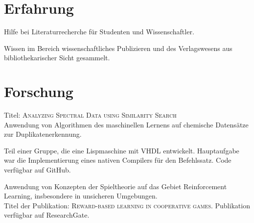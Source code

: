 \documentclass[]{deedy-resume-openfont}
\begin{document}
\begin{minipage}[t]{0.66\textwidth} 


\section{Erfahrung}

\vspace{\topsep} %
\begin{tightemize}
\item Hilfe bei Literaturrecherche für Studenten und Wissenschaftler.
\item Wissen im Bereich wissenschaftliches Publizieren und des Verlagswesens aus bibliothekarischer Sicht gesammelt.
\end{tightemize}
\sectionsep


\section{Forschung}
\descript{}
Titel: \textsc{Analyzing Spectral Data using Similarity Search} \\
Anwendung von Algorithmen des maschinellen Lernens auf chemische Datensätze zur Duplikatenerkennung. 
\sectionsep

Teil einer Gruppe, die eine Lispmaschine mit VHDL entwickelt. Hauptaufgabe war die Implementierung eines nativen Compilers für den Befehlssatz. Code verfügbar auf GitHub.

\descript{}
Anwendung von Konzepten der Spieltheorie auf das Gebiet Reinforcement Learning, insbesondere in unsicheren Umgebungen. \\
Titel der Publikation: \textsc{Reward-based learning in cooperative games}. Publikation verfügbar auf ResearchGate. 
\sectionsep


\end{minipage} 
\end{document}
